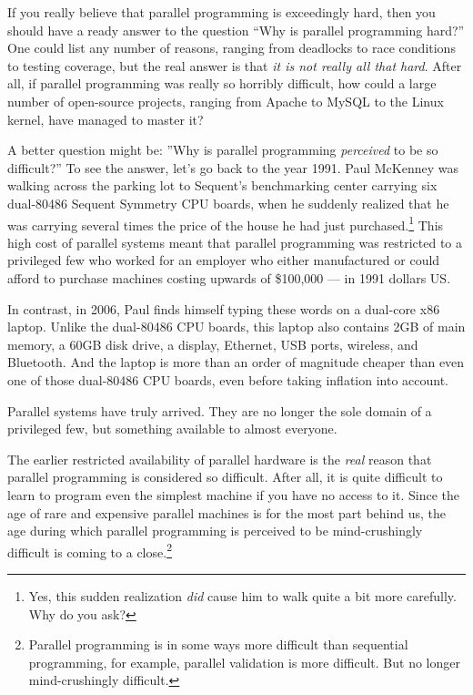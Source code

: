 
	If you really believe that parallel programming is exceedingly
	hard, then you should have a ready answer to the question
	``Why is parallel programming hard?''
	One could list any number of reasons, ranging from deadlocks to
	race conditions to testing coverage, but the real answer is that
	{\em it is not really all that hard}.
	After all, if parallel programming was really so horribly difficult,
	how could a large number of open-source projects, ranging from Apache
	to MySQL to the Linux kernel, have managed to master it?

	A better question might be: ''Why is parallel programming {\em
	perceived} to be so difficult?''
	To see the answer, let's go back to the year 1991.
	Paul McKenney was walking across the parking lot to Sequent's
	benchmarking center carrying six dual-80486 Sequent Symmetry CPU
	boards, when he suddenly realized that he was carrying several
	times the price of the house he had just purchased.\footnote{
		Yes, this sudden realization {\em did} cause him to walk quite
		a bit more carefully.
		Why do you ask?}
	This high cost of parallel systems meant that
	parallel programming was restricted to a privileged few who
	worked for an employer who either manufactured or could afford to
	purchase machines costing upwards of \$100,000 --- in 1991 dollars US.

	In contrast, in 2006, Paul finds himself typing these words on a
	dual-core x86 laptop.
	Unlike the dual-80486 CPU boards, this laptop also contains
	2GB of main memory, a 60GB disk drive, a display, Ethernet,
	USB ports, wireless, and Bluetooth.
	And the laptop is more than an order of magnitude cheaper than
	even one of those dual-80486 CPU boards, even before taking inflation
	into account.

	Parallel systems have truly arrived.
	They are no longer the sole domain of a privileged few, but something
	available to almost everyone.

	The earlier restricted availability of parallel hardware is
	the \emph{real} reason that parallel programming is considered
	so difficult.
	After all, it is quite difficult to learn to program even the simplest
	machine if you have no access to it.
	Since the age of rare and expensive parallel machines is for the most
	part behind us, the age during which
	parallel programming is perceived to be mind-crushingly difficult is
	coming to a close.\footnote{
		Parallel programming is in some ways more difficult than
		sequential programming, for example, parallel validation
		is more difficult.
		But no longer mind-crushingly difficult.}

